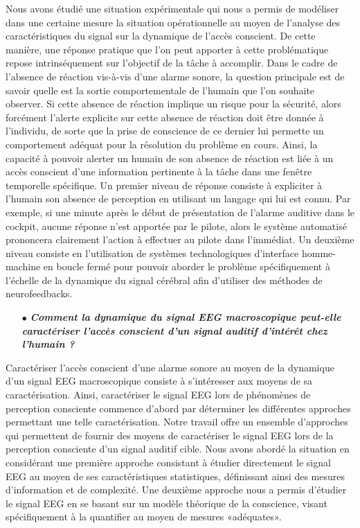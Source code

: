 Nous avons étudié une situation expérimentale qui nous a permis de modéliser dans une certaine mesure la situation opérationnelle au moyen de l'analyse des caractéristiques du signal sur la dynamique de l'accès conscient. 
De cette manière, une réponse pratique que l'on peut apporter à cette problématique repose intrinséquement sur l'objectif de la tâche à accomplir. 
Dans le cadre de l'absence de réaction vis-à-vis d'une alarme sonore, la question principale est de savoir quelle est la sortie comportementale de l'humain que l'on souhaite observer. 
Si cette absence de réaction implique un risque pour la sécurité, alors forcément l'alerte explicite sur cette absence de réaction doit être donnée à l'individu, de sorte que la prise de conscience de ce dernier lui permette un comportement adéquat pour la résolution du problème en cours. 
Ainsi, la capacité à pouvoir alerter un humain de son absence de réaction est liée à un accès conscient d'une information pertinente à la tâche dans une fenêtre temporelle spécifique. 
Un premier niveau de réponse consiste à expliciter à l'humain son absence de perception en utilisant un langage qui lui est connu. 
Par exemple, si une minute après le début de présentation de l'alarme auditive dans le cockpit, aucune réponse n'est apportée par le pilote, alors le système automatisé prononcera clairement l'action à effectuer au pilote dans l'immédiat. 
Un deuxième niveau consiste en l'utilisation de systèmes technologiques d'interface homme-machine en boucle fermé pour pouvoir aborder le problème spécifiquement à l'échelle de la dynamique du signal cérébral afin d'utiliser des méthodes de neurofeedbacks. \\

\begin{itemize}
\item[$\bullet$] \textit{\textbf{Comment la dynamique du signal EEG macroscopique peut-elle caractériser l'accès conscient d'un signal auditif d'intérêt chez l'humain ? }} \\
\end{itemize}

Caractériser l'accès conscient d'une alarme sonore au moyen de la dynamique d'un signal EEG macroscopique consiste à s'intéresser aux moyens de sa caractérisation. 
Ainsi, caractériser le signal EEG lors de phénomènes de perception consciente commence d'abord par déterminer les différentes approches permettant une telle caractérisation. 
Notre travail offre un ensemble d'approches qui permettent de fournir des moyens de caractériser le signal EEG lors de la perception consciente d'un signal auditif cible. 
Nous avons abordé la situation en considérant une première approche consistant à étudier directement le signal EEG au moyen de ses caractéristiques statistiques, définissant ainsi des mesures d'information et de complexité. 
Une deuxième approche nous a permis d'étudier le signal EEG en se basant sur un modèle théorique de la conscience, visant spécifiquement à la quantifier au moyen de mesures «adéquates». 

